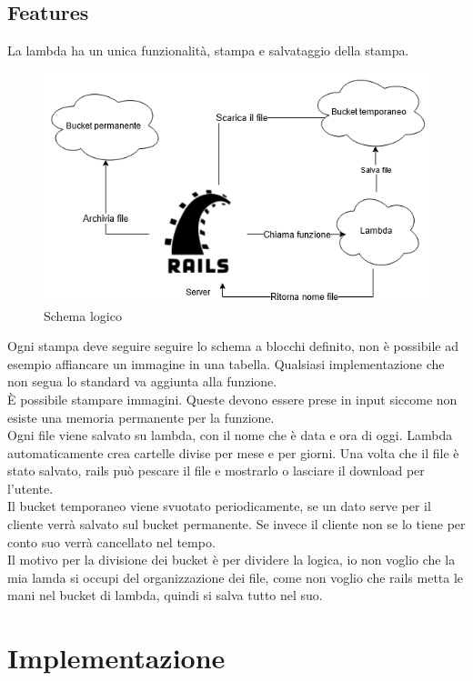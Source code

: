 \documentclass[12pt]{article}
\begin{document}
\subsection{Features}
La lambda ha un unica funzionalità, stampa e salvataggio della stampa.
\begin{figure}[H]
\includegraphics[scale = 0.6]{useCases.png}
\caption{Schema logico}
\end{figure}
Ogni stampa deve seguire seguire lo schema a blocchi definito, non è possibile 
ad esempio affiancare un immagine in una tabella. 
Qualsiasi implementazione che non segua lo standard va aggiunta alla funzione.
\\ È possibile stampare immagini. Queste devono essere prese in input siccome non 
esiste una memoria permanente per la funzione.
\\ Ogni file viene salvato su lambda, con il nome che è data e ora di oggi. 
Lambda automaticamente crea cartelle divise per mese e per giorni. 
Una volta che il file è stato salvato, rails può pescare il file e mostrarlo 
o lasciare il download per l'utente.
\\ Il bucket temporaneo viene svuotato periodicamente, se un dato serve per il 
cliente verrà salvato sul bucket permanente. 
Se invece il cliente non se lo tiene per conto suo verrà cancellato nel tempo.
\\ Il motivo per la divisione dei bucket è per dividere la logica, io non voglio 
che la mia lamda si occupi del organizzazione dei file, come non voglio 
che rails metta le mani nel bucket di lambda, quindi si salva tutto nel suo.



\section{Implementazione}
\end{document}
